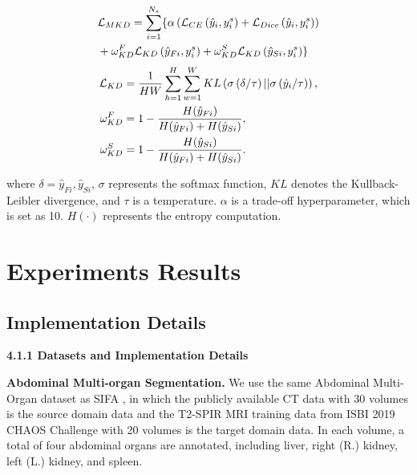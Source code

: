 \documentclass[letterpaper]{article} %
\begin{document}
{\small  
\begin{align}
    &\mathcal{L}_{MKD}=\sum_{i=1}^{N_s}\{\alpha\left(\mathcal{L}_{CE}\left(\hat{y}_{i},y_i^s\right)+\mathcal{L}_{Dice}\left(\hat{y}_{i},y_i^s \right)\right)  \notag\\
   & + \omega_{KD}^{F}\mathcal{L}_{KD} \left(\hat{y}_{Fi},y_i^s \right) + \omega_{KD}^{S}\mathcal{L}_{KD} \left(\hat{y}_{Si},y_i^s \right)\}   \label{eq7} 
    \end{align}
}
{\small
\begin{align}
    \mathcal{L}_{KD} &=\frac{1}{HW}\sum_{h=1}^{H}\sum_{w=1}^{W}KL\left(\sigma\left(\delta/\tau\right)||\sigma\left(\hat{y}_{i}/\tau\right)\right), \notag \\
     \omega_{KD}^{F}& = 1 - \frac{H(\hat{y}_{Fi})}{H(\hat{y}_{Fi})+H(\hat{y}_{Si})}, \notag \\
     \omega_{KD}^{S}& = 1 - \frac{H(\hat{y}_{Si})}{H(\hat{y}_{Fi})+H(\hat{y}_{Si})}.
    \label{eq8}
\end{align}
}




\noindent
where $\delta=\hat{y}_{Fi},\hat{y}_{Si} $, $\sigma$ represents the softmax function, $KL$ denotes the Kullback-Leibler divergence, and $\tau$ is a temperature. $\alpha$ 
is a trade-off hyperparameter, which is set as 10. $H(\cdot)$ represents the entropy computation.

\section{Experiments Results}

\subsection{Implementation Details}

\noindent  \textbf{4.1.1 Datasets and Implementation Details}


\noindent \textbf{Abdominal Multi-organ Segmentation.} We use the same Abdominal Multi-Organ dataset as SIFA \cite{2}, in which 
the publicly available CT data \cite{39} with 30 volumes is the source domain data and the T2-SPIR MRI training 
data from ISBI 2019 CHAOS Challenge \cite{38} with 20 volumes is the target domain data. In each volume, a total 
of four abdominal organs are annotated, including liver, right (R.) kidney, left (L.) kidney, and spleen.
\end{document}
